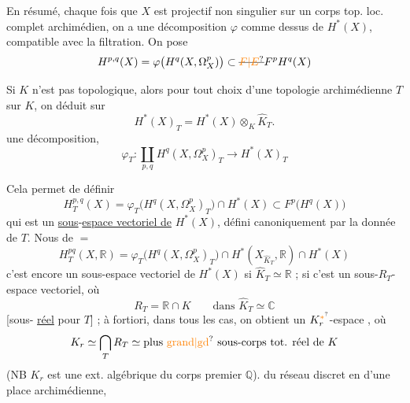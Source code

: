 
En résumé, chaque fois que $X$ est
projectif non singulier sur un corps
 top. loc.  complet archimédien,
on a une décomposition $\varphi$ comme
dessus de $H^*(X)$, compatible avec la
filtration.  On pose
\[
H^{p,q}(X)=\varphi\big(H^q(X,\Omega_X^p)\big)\subset \deleted{\unsure{F|E}}F^p H^q(X)
\]

Si $K$ n'est pas topologique, alors pour
tout choix d'une topologie  archimédienne
$T$ sur $K$, on déduit sur
\[
H^*(X)_T=H^*(X)\otimes_K\widehat K_T.
\]
une décomposition,
\[
\boxed{\varphi_T:\coprod_{p,q}H^q(X,\Omega_X^p)_T\longrightarrow H^*(X)_T}
\]

Cela permet de définir
\[
H_T^{p,q}(X)=\varphi_T\big(H^q(X,\Omega_X^p)_T\big)\cap H^*(X)
 \subset F^p\big(H^q(X)\big)
\]
qui est un \uline{sous}-\uline{espace vectoriel de} $H^*(X)$,
défini canoniquement par la donnée de $T$. Nous
 de $=$
\[
H_T^{pq}(X,\mathbb R)=\varphi_T\big(H^q(X,\Omega_X^p)_T\big)
\cap H^*(X_{\widehat K_T},\mathbb R)\cap H^*(X)
\]
c'est encore un sous-espace vectoriel de $H^*(X)$
si $\widehat K_T\simeq\mathbb R$ ; si  c'est un sous-$R_T$-espace vectoriel, où
\[
R_T=\mathbb R\cap K\qquad\text{dans }\widehat K_T\simeq\mathbb C
\]
[sous- \uline{réel} pour $T$] ; à fortiori,  dans tous les
cas, on obtient un $K_r^{\unsure{*}}$-espace , où
\[
K_r\simeq\bigcap_T R_T\simeq\text{plus \unsure{grand|gd} sous-corps tot. réel de }K
\]
(NB $K_r$ est une ext. algébrique du corps premier $\mathbb Q$).
 du réseau discret en  d'une place archimédienne,

